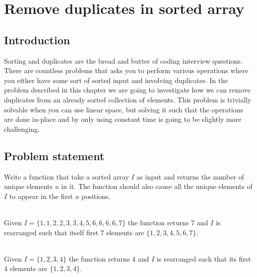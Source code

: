 %



\chapter{Remove duplicates in sorted array}
\label{ch:remove_duplicated_sorted_array_inplace}
\section*{Introduction}
Sorting and duplicates are the bread and butter of coding interview questions. There are countless
problems that asks you to perform various operations where you either have some sort of sorted input and involving duplicates.
In the problem described in this chapter we are going to investigate how we can remove duplicates from an already sorted collection of elements.
This problem is trivially solvable when you can use linear space, 
but solving it such that the operations are done in-place and by only using constant time is going to be slightly more challenging.


\section{Problem statement}
\begin{exercise}
Write a function that take a sorted array $I$ as input and  returns the number of unique elements $u$ in it.
The function should also cause all the unique elements of $I$ to appear in the first $u$ positions.

\label{example:remove_duplicated_sorted_array_inplace:exercice1}

	\begin{example}
		\label{example:remove_duplicated_sorted_array_inplace:example1}
		\hfill \\
		Given $I=\{1,1,2,2,3,3,4,5,6,6,6,6,7\}$ the function returns $7$ and $I$ is rearranged such that itself
		first $7$ elements are $\{1,2,3,4,5,6,7\}$.				
	\end{example}

	\begin{example}
		\label{example:remove_duplicated_sorted_array_inplace:example2}
		\hfill \\
		Given $I=\{1,2,3,4\}$ the function returns $4$ and $I$ is rearranged such that its first
		$4$ elements are $\{1,2,3,4\}$.	
	\end{example}
\end{exercise}

